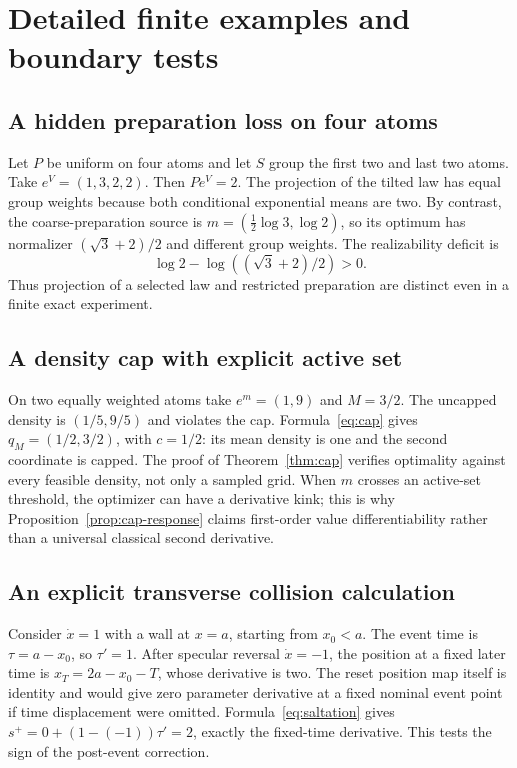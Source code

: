 \section{Detailed finite examples and boundary tests}\label{app:examples}
\subsection{A hidden preparation loss on four atoms}
Let $P$ be uniform on four atoms and let $S$ group the first two and last two atoms. Take $e^V=(1,3,2,2)$. Then $Pe^V=2$. The projection of the tilted law has equal group weights because both conditional exponential means are two. By contrast, the coarse-preparation source is
$m=(\frac12\log3,\log2)$, so its optimum has normalizer
$(\sqrt3+2)/2$ and different group weights. The realizability deficit is
\[
 \log2-\log((\sqrt3+2)/2)>0.
\]
Thus projection of a selected law and restricted preparation are distinct even in a finite exact experiment.

\subsection{A density cap with explicit active set}
On two equally weighted atoms take $e^m=(1,9)$ and $M=3/2$. The uncapped density is $(1/5,9/5)$ and violates the cap. Formula~\eqref{eq:cap} gives $q_M=(1/2,3/2)$, with $c=1/2$: its mean density is one and the second coordinate is capped. The proof of Theorem~\ref{thm:cap} verifies optimality against every feasible density, not only a sampled grid. When $m$ crosses an active-set threshold, the optimizer can have a derivative kink; this is why Proposition~\ref{prop:cap-response} claims first-order value differentiability rather than a universal classical second derivative.

\subsection{An explicit transverse collision calculation}
Consider $\dot x=1$ with a wall at $x=a$, starting from $x_0<a$. The event time is $\tau=a-x_0$, so $\tau'=1$. After specular reversal $\dot x=-1$, the position at a fixed later time is
$x_T=2a-x_0-T$, whose derivative is two. The reset position map itself is identity and would give zero parameter derivative at a fixed nominal event point if time displacement were omitted. Formula~\eqref{eq:saltation} gives
$s^+=0+(1-(-1))\tau'=2$, exactly the fixed-time derivative. This tests the sign of the post-event correction.

